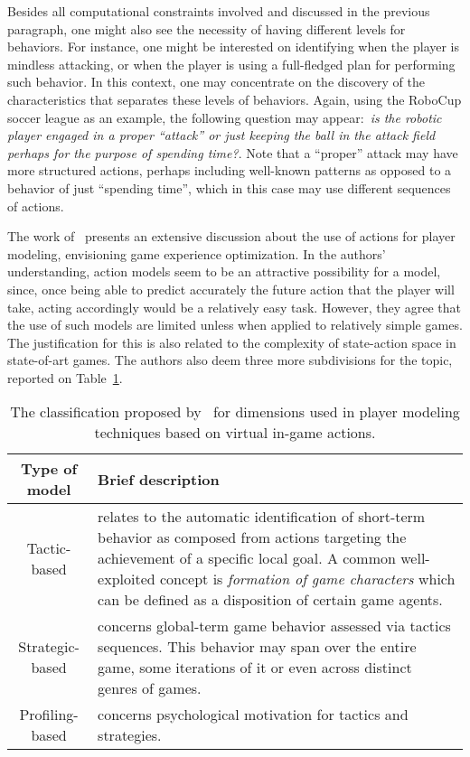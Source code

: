 Besides all computational constraints involved and discussed in the previous paragraph, one might also see  the necessity of having different levels for behaviors. For instance, one might be interested on identifying when the player is mindless attacking, or when the player is using a full-fledged plan for performing such behavior. In this context, one may concentrate on the discovery of the characteristics that separates these levels of behaviors. Again, using the RoboCup soccer league as an example, the following question may appear:~\textit{is the robotic player engaged in a proper ``attack'' or just keeping the ball in the attack field perhaps for the purpose of spending time?}. Note that a ``proper'' attack may have more structured actions, perhaps including well-known patterns as opposed to a behavior of just ``spending time'', which in this case may use different sequences of actions.

The work of~\cite{bakkes_player_2012} presents an extensive discussion about the use of actions for player modeling, envisioning game experience optimization. In the authors' understanding, action models seem to be an attractive possibility for a model, since, once being able to predict accurately the future action that the player will take, acting accordingly would be a relatively easy task. However, they agree that the use of such models are limited unless when applied to relatively simple games. The justification for this is also related to the complexity of state-action space in state-of-art games. The authors also deem three more subdivisions for the topic, reported on Table~\ref{actionModels}.

\begin{table}[!ht]
\centering
\caption{The classification proposed by~\cite{bakkes_player_2012} for dimensions used in player modeling techniques based on virtual in-game actions.}
\label{actionModels}
\begin{tabularx}{\textwidth}{|c|X|} \hline
\textbf{Type of model}&\textbf{Brief description}\\ \hline
Tactic-based & relates to the automatic identification of short-term behavior as composed from actions targeting the achievement of a specific local goal. A common well-exploited concept is \textit{formation of game characters} which can be defined as a disposition of certain game agents.\\ \hline
Strategic-based & concerns global-term game behavior assessed via tactics sequences. This behavior may span over the entire game, some iterations of it or even across distinct genres of games.\\ \hline
Profiling-based & concerns psychological motivation for tactics and strategies.\\ \hline
\end{tabularx}
\end{table}

